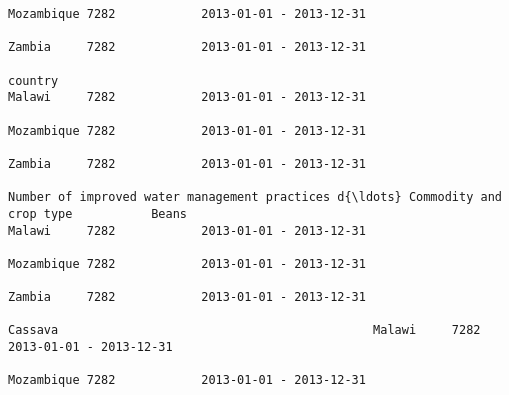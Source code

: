 \documentclass[11pt]{article}
\begin{document}
\begin{Verbatim}[commandchars=\\\{\}]
                                                                                                                                                                                                                 Mozambique 7282            2013-01-01 - 2013-12-31   
                                                                                                                                                                                                                 Zambia     7282            2013-01-01 - 2013-12-31   
                                                                                                                            country                                                                              Malawi     7282            2013-01-01 - 2013-12-31   
                                                                                                                                                                                                                 Mozambique 7282            2013-01-01 - 2013-12-31   
                                                                                                                                                                                                                 Zambia     7282            2013-01-01 - 2013-12-31   
                                                                         Number of improved water management practices d{\ldots} Commodity and crop type           Beans                                              Malawi     7282            2013-01-01 - 2013-12-31   
                                                                                                                                                                                                                 Mozambique 7282            2013-01-01 - 2013-12-31   
                                                                                                                                                                                                                 Zambia     7282            2013-01-01 - 2013-12-31   
                                                                                                                                                              Cassava                                            Malawi     7282            2013-01-01 - 2013-12-31   
                                                                                                                                                                                                                 Mozambique 7282            2013-01-01 - 2013-12-31   

\end{Verbatim}
\end{document}

